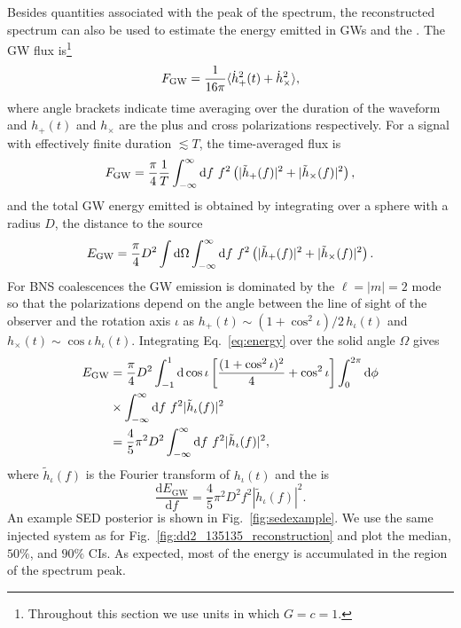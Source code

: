 \documentclass[aps,prd,amsmath,floats,floatfix, twocolumn,
superscriptaddress,nofootinbib,showpacs]{revtex4-1}
\newcommand{\nn}{\nonumber}
\begin{document}
Besides quantities associated with the peak of the spectrum, the reconstructed spectrum can also be used to estimate the energy emitted in GWs and the \sed{}.  The GW flux is\footnote{Throughout this section we use units in which $G=c=1$.}
%
\begin{equation}
F_{\rm{GW}} = \frac{1}{16\pi} \langle \dot{h}_+^2(t) + \dot{h}_{\times}^2\rangle,
\end{equation}
%
where angle brackets indicate time averaging over the duration of the waveform and $h_+(t)$ and $h_{\times}$ are the plus and cross polarizations respectively. For a signal with effectively finite duration $\lesssim T$, the time-averaged flux is~\cite{SuttonBursts}
%
\begin{equation}
F_{\rm{GW}} = \frac{\pi }{4} \frac{1}{T} \int_{-\infty}^{\infty} \mathrm{d}f~f^2 \left(|\tilde{h}_+(f)|^2 + |\tilde{h}_{\times}(f)|^2 \right),
\end{equation}
%
and the total GW energy emitted is obtained by integrating over a sphere with a radius $D$, the distance to the source
%
\begin{equation}\label{eq:energy}
E_{\rm{GW}} = \frac{\pi}{4} D^2 \int \mathrm{d}\Omega \int_{-\infty}^{\infty} \mathrm{d}f~f^2 \left(|\tilde{h}_+(f)|^2 + |\tilde{h}_{\times}(f)|^2 \right).
\end{equation}
%
For BNS coalescences the GW emission is dominated by the $\ell=|m|=2$ mode so that the polarizations depend on the angle between the line of sight of the observer and the rotation axis $\iota$ as $h_+(t) \sim (1+\cos^2\iota)/2\, h_{\iota}(t)$ and $h_{\times}(t) \sim \cos \iota\, h_{\iota}(t)$.  Integrating Eq.~\ref{eq:energy} over the solid angle $\Omega$ gives
%
\begin{align}
E_{\rm{GW}} &=\frac{\pi}{4} D^2\int_{-1}^{1}  \mathrm{d} \cos{\iota}\left[  \frac{(1+\cos^2{\iota})^2}{4}+\cos^2\iota\right]\int_0^{2\pi}  \mathrm{d}\phi  \nn
\\
&\times \int_{-\infty}^{\infty} \mathrm{d}f~f^2 |\tilde{h}_{\iota}(f)|^2\nn
\\
& =  \frac{4}{5}\pi^2D^2  \int_{-\infty}^{\infty} \mathrm{d}f~f^2 |\tilde{h}_{\iota}(f)|^2,\label{eq:energyfinal}
\end{align}
%
where $\tilde{h}_{\iota}(f)$ is the Fourier transform of $h_{\iota}(t)$
and the \sed{} is
%
\begin{equation}
\frac{\mathrm{d}E_{\mathrm{GW}}}{\mathrm{d} f} = \frac{4}{5} \pi^2 D^2 f^2 |\tilde{h}_{\iota}(f)|^2.
\end{equation}
%
An example SED posterior is shown in Fig.~\ref{fig:sedexample}. We use the same injected system as for Fig.~\ref{fig:dd2_135135_reconstruction} and plot the median, $50\%$, and $90\%$ CIs. As expected, most of the energy is accumulated in the region of the spectrum peak. 
\end{document}
